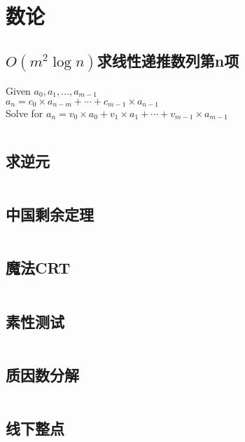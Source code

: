 \chapter{数论}
\section{$O(m^2\log n)$求线性递推数列第n项}
Given $a_0, a_1, \ldots, a_{m - 1}$\\
	$a_n = c_0 \times a_{n - m} + \cdots + c_{m - 1} \times a_{n - 1}$\\
	Solve for $a_n = v_0 \times a_0 + v_1 \times a_1 + \cdots + v_{m - 1} \times a_{m - 1}$\\
\inputminted{cpp}{\source/number-theory/linear-recurrence.cpp}
\section{求逆元}
\inputminted{cpp}{\source/number-theory/get-inversion.cpp}
\section{中国剩余定理}
\inputminted{cpp}{\source/number-theory/chinese-remainder-theorem.cpp}
\section{魔法CRT}
\inputminted{cpp}{\source/number-theory/magic-crt.cpp}
\section{素性测试}
\inputminted{cpp}{\source/number-theory/primality-test.cpp}
\section{质因数分解}
\inputminted{cpp}{\source/number-theory/pollards-rho-algorithm.cpp}
\section{线下整点}
\inputminted{cpp}{\source/number-theory/integer-lattice-under-segment.cpp}
